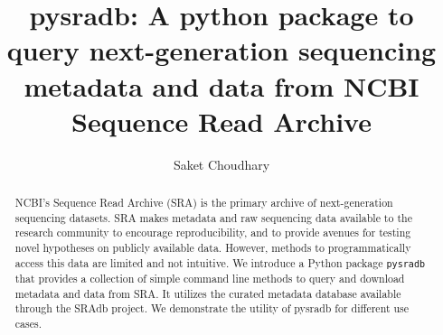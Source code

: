\documentclass[9pt,a4paper]{extarticle}
\begin{document}
\pagestyle{front}
\title{pysradb: A python package to query next-generation sequencing metadata
and data from NCBI Sequence Read Archive}
\author[]{Saket Choudhary}


\maketitle
\thispagestyle{front}


\begin{abstract}

NCBI’s Sequence Read Archive (SRA) is the primary archive of next-generation sequencing datasets. SRA makes metadata and raw sequencing data available to the research community to encourage reproducibility, and to provide avenues for testing novel hypotheses on publicly available data. However, methods to programmatically access this data are limited and not intuitive. We introduce a Python package \texttt{pysradb} that provides a collection of simple command line methods to query and download metadata and data from SRA. It utilizes the curated metadata database available through the SRAdb project. We demonstrate the utility of pysradb for different use cases. %


\end{abstract}
\end{document}
